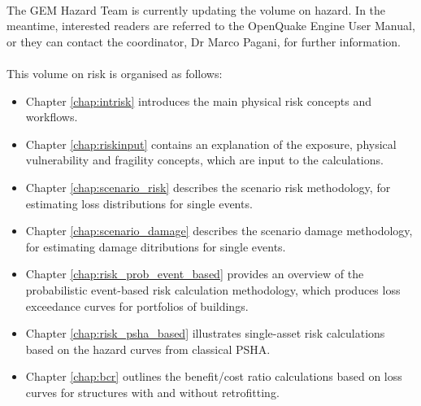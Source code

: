 \hfill \\
The GEM Hazard Team is currently updating the volume on hazard. In the meantime, interested readers are referred to the OpenQuake Engine User Manual, or they can contact the coordinator, Dr Marco Pagani, for further information. 
\hfill \\
\hfill \\
This volume on risk is organised as follows:
\begin{itemize}
\item Chapter \ref{chap:intrisk} introduces the main physical risk concepts and workflows. 
\item Chapter \ref{chap:riskinput} contains an explanation of the exposure, physical vulnerability and fragility concepts, which are input to the calculations.
\item Chapter \ref{chap:scenario_risk} describes the scenario risk 
methodology, for estimating loss distributions for single events.
\item Chapter \ref{chap:scenario_damage} describes the scenario damage 
methodology, for estimating damage ditributions for single events.
\item Chapter \ref{chap:risk_prob_event_based} provides an overview of the probabilistic event-based risk calculation methodology, which produces loss exceedance curves for portfolios of buildings.
\item Chapter \ref{chap:risk_psha_based} illustrates single-asset risk calculations based on the hazard curves from classical PSHA.
\item Chapter \ref{chap:bcr} outlines the benefit/cost ratio calculations based on loss curves for structures with and without retrofitting.
\end{itemize}

